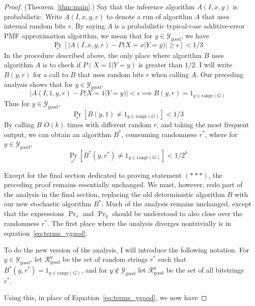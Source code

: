 \documentclass{article}
\def \Ygood{\mathcal{Y}_\text{good}}
\def \Rgood{\mathcal{R}_\text{good}}
\def \by{{\bar{y}}}
\theoremstyle{definition}
\theoremstyle{remark}
\begin{document}
\begin{proof}{(Theorem~\ref{thm:main}.)}
Say that the inference algorithm $A(I, x, y)$ is probabilistic.
Write $A(I, x, y, r)$ to denote a run of algorithm $A$ that uses internal random bits $r$.
By saying $A$ is a probabilistic typical-case additive-error PMF approximation algorithm, we mean that for $y \in \Ygood$, we have
$$
\Pr_r [|A(I, x, y, r) - P(X = x | Y = y)| \geq \epsilon] < 1/3
$$
In the procedure described above, the only place where algorithm $B$ uses algorithm $A$ is to check if $P(X = 1 | Y = y)$ is greater than $1/2$.
I will write $B(y, r)$ for a call to $B$ that uses random bits $r$ when calling $A$.
Our preceding analysis shows that for $y \in \Ygood$,
$$
|A(I, 1, y, r) - P(X = 1 | Y = y)| < \epsilon \implies  B(y, r) = 1_{y \in \text{range}(G)}
$$
Thus for $y \in \Ygood$,
$$
\Pr_r [B(y, 1) \neq 1_{y \in \text{range}(G)}] < 1/3
$$
By calling $B$ $O(k)$ times with different random $r$, and taking the most frequent output, we can obtain an algorithm $B^*$, comsuming randomness $r^*$, where for $y \in \Ygood$,
$$
\Pr_{r^*} [B^*(y, r^*) \neq 1_{y \in \text{range}(G)}] < 1/2^k
$$

Except for the final section dedicated to proving statement $(***)$, the preceding proof remains essentially unchanged.
We must, however, redo part of the analysis in the final section, replacing the old deterministic algorithm $B$ with our new stochastic algorithm $B^*$.
Much of the analysis remains unchanged, except that
the expressions $\Pr_s$ and $\Pr_\by$ should be understood to also close over the randomness $r^*$.
The first place where the analysis diverges nontrivially is in equation~\ref{eq:terms_ygood}.

To do the new version of the analysis, I will introduce the following notation. For $y \in \Ygood$, let $\Rgood^y$ be the set of random strings $r^*$ such that $B^*(y, r^*) = 1_{y \in \text{range}(G)}$,
and for $y \notin \Ygood$ let $\Rgood^y$ be the set of all bitstrings $r^*$.

Using this, in place of Equation~\ref{eq:terms_ygood}, we now have


\end{proof}
\end{document}
